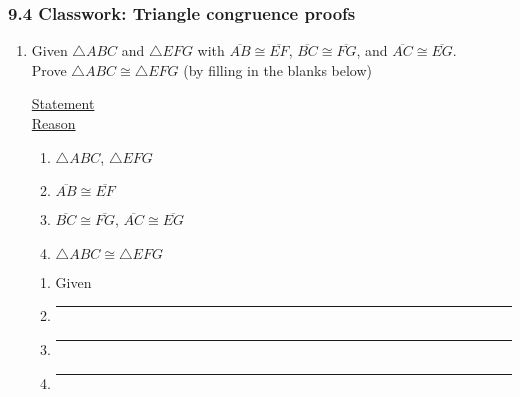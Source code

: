 \documentclass[12pt, twoside]{article}
\begin{document}
\subsubsection*{9.4 Classwork: Triangle congruence proofs}
  \begin{enumerate}

  \item Given $\triangle ABC$ and $\triangle EFG$ with $\overline{AB} \cong \overline{EF}$, $\overline{BC} \cong \overline{FG}$, and $\overline{AC} \cong \overline{EG}$. \\Prove $\triangle ABC \cong \triangle EFG$ (by filling in the blanks below)\\[0.5cm]
    \begin{multicols}{2}
      \underline{Statement} \\
      \underline{Reason}
    \end{multicols}
    \begin{multicols}{2}
      \raggedcolumns
      \begin{enumerate}[label={\arabic*)}]
        \item $\triangle ABC$, $\triangle EFG$
        \item $\overline{AB} \cong \overline{EF}$
        \item $\overline{BC} \cong \overline{FG}$, $\overline{AC} \cong \overline{EG}$
        \item $\triangle ABC \cong \triangle EFG$
      \end{enumerate}
      \begin{enumerate}[label={\arabic*)}]
        \item Given
        \item \rule{4cm}{0.15mm}
        \item \rule{4cm}{0.15mm}
        \item \rule{4cm}{0.15mm}
      \end{enumerate}
    \end{multicols}


\end{enumerate}
\end{document}
